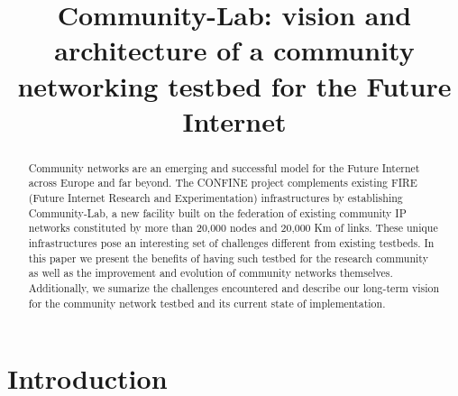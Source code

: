 \documentclass[conference]{IEEEtran}
\begin{document}
\title{Community-Lab: vision and architecture of a community networking testbed for the Future Internet}



\maketitle


\begin{abstract}
Community networks are an emerging and successful model for the Future Internet
across Europe and far beyond. The CONFINE project complements existing FIRE (Future Internet
Research and Experimentation) infrastructures by establishing Community-Lab,
a new facility built on the federation of existing community IP networks constituted by more than 20,000 nodes and 20,000 Km of links. These unique infrastructures pose an interesting set of challenges different from existing testbeds. In this paper we present the benefits of having such testbed for the research community as well as the improvement and evolution of community networks themselves. Additionally, we sumarize the challenges encountered and describe our long-term vision for the community network testbed and its current state of implementation.
\end{abstract}

\section{Introduction}
\end{document}
